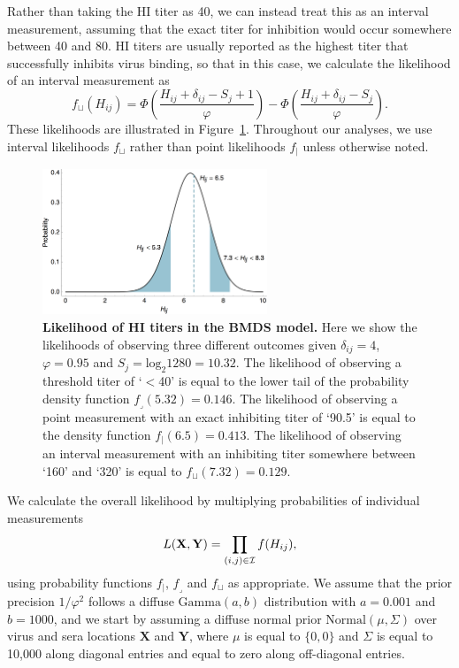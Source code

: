 \documentclass[11pt,oneside,letterpaper]{article}
\newcommand{\point}{f_{\scriptscriptstyle \vert}}	%
\newcommand{\threshold}{f_{\textstyle \lrcorner}}	%
\newcommand{\interval}{f_{\sqcup}}					%
\newcommand{\mdssd}{\varphi}						%
\begin{document}
Rather than taking the HI titer as 40, we can instead treat this as an interval measurement, assuming that the exact titer for inhibition would occur somewhere between 40 and 80.
HI titers are usually reported as the highest titer that successfully inhibits virus binding, so that in this case, we calculate the likelihood of an interval measurement as
\begin{equation} 
	\interval(H_{ij}) = \Phi \left( \frac{ H_{ij} + \delta_{ij} - S_j + 1 }{ \mdssd } \right) - \Phi \left( \frac{ H_{ij} + \delta_{ij} - S_j }{\mdssd} \right).
\end{equation}
These likelihoods are illustrated in Figure~\ref{hij_likelihood}.
Throughout our analyses, we use interval likelihoods $\interval$ rather than point likelihoods $\point$ unless otherwise noted.

\begin{figure}[tb]
	\centering		
	\includegraphics[width=0.6\textwidth]{figures/hij_likelihood}
	\caption{\textbf{Likelihood of HI titers in the BMDS model.} 
	Here we show the likelihoods of observing three different outcomes given $\delta_{ij} = 4$, $\mdssd = 0.95$ and $S_j = \mathrm{log}_2 1280 = 10.32$.  
	The likelihood of observing a threshold titer of `$<$40' is equal to the lower tail of the probability density function $\threshold(5.32) = 0.146$.
	The likelihood of observing a point measurement with an exact inhibiting titer of `90.5' is equal to the density function $\point(6.5) = 0.413$.
	The likelihood of observing an interval measurement with an inhibiting titer somewhere between `160' and `320' is equal to $\interval(7.32) = 0.129.$
	} 
	\label{hij_likelihood} 
\end{figure}

We calculate the overall likelihood by multiplying probabilities of individual measurements
\begin{equation} 
	L(\mathbf{X},\mathbf{Y}) = \prod_{(i,j) \in \cal I} f(H_{ij}),
\end{equation}
using probability functions $\point$, $\threshold$ and $\interval$ as appropriate.
We assume that the prior precision $1/\mdssd^2$ follows a diffuse $\mbox{Gamma}(a, b)$ distribution with $a=0.001$ and $b=1000$, and we start by assuming a diffuse normal prior $\mathrm{Normal}(\mu,\Sigma)$ over virus and sera locations $\mathbf{X}$ and $\mathbf{Y}$, where $\mu$ is equal to $\{0,0\}$ and $\Sigma$ is equal to 10,000 along diagonal entries and equal to zero along off-diagonal entries.
\end{document}
